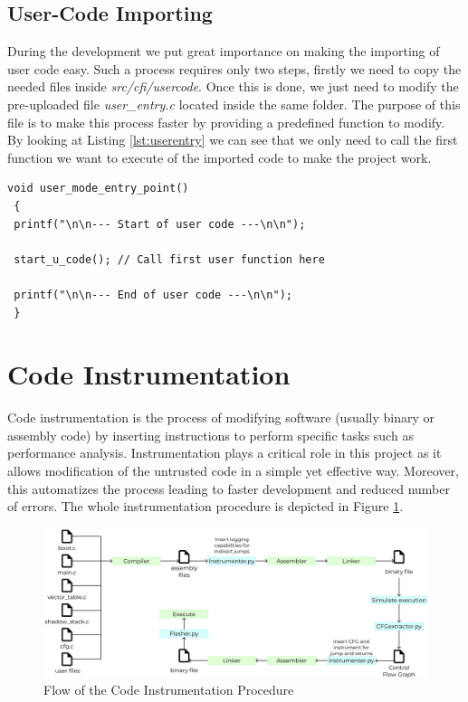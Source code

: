 \subsection{User-Code Importing}
\label{subsec:project_ucodeimport}

During the development we put great importance on making the importing of user code
easy. Such a process requires only two steps, firstly we need to copy the needed
files inside \textit{src/cfi/usercode}. Once this is done, we just need to
modify the pre-uploaded file \textit{user\_entry.c} located inside the same folder.
The purpose of this file is to make this process faster by providing a
predefined function to modify. By looking at Listing \ref{lst:userentry} we can see
that we only need to call the first function we want to execute of the imported code
to make the project work. \\
\begin{lstlisting}[style=CStyle, caption = \textit{user\_entry.c} File, label={lst:userentry}]
void user_mode_entry_point()
 {
 printf("\n\n--- Start of user code ---\n\n");

 start_u_code(); // Call first user function here

 printf("\n\n--- End of user code ---\n\n");
 }
\end{lstlisting}

\section{Code Instrumentation}
\label{sec:project_instrumentation}

Code instrumentation is the process of modifying software (usually binary or assembly
code) by inserting instructions to perform specific tasks such as performance
analysis. Instrumentation plays a critical role in this project as it allows modification
of the untrusted code in a simple yet effective way. Moreover, this automatizes the
process leading to faster development and reduced number of errors. The whole
instrumentation procedure is depicted in Figure \ref{fig:instrumentation}. \\
\begin{figure}[htbp]
  \centering
  \includegraphics[width=.9\linewidth]{images/instrumentation.png}
  \caption{Flow of the Code Instrumentation Procedure}
  \label{fig:instrumentation}
\end{figure}
\\

